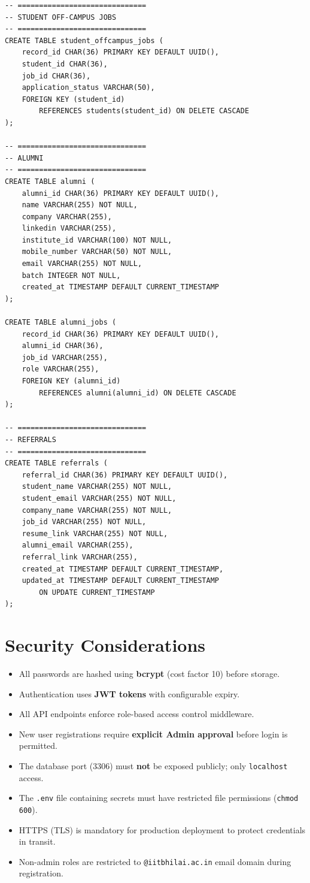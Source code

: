 \documentclass[12pt,a4paper]{article}
\begin{document}
\begin{lstlisting}[style=sqlstyle]
-- ==============================
-- STUDENT OFF-CAMPUS JOBS
-- ==============================
CREATE TABLE student_offcampus_jobs (
    record_id CHAR(36) PRIMARY KEY DEFAULT UUID(),
    student_id CHAR(36),
    job_id CHAR(36),
    application_status VARCHAR(50),
    FOREIGN KEY (student_id)
        REFERENCES students(student_id) ON DELETE CASCADE
);

-- ==============================
-- ALUMNI
-- ==============================
CREATE TABLE alumni (
    alumni_id CHAR(36) PRIMARY KEY DEFAULT UUID(),
    name VARCHAR(255) NOT NULL,
    company VARCHAR(255),
    linkedin VARCHAR(255),
    institute_id VARCHAR(100) NOT NULL,
    mobile_number VARCHAR(50) NOT NULL,
    email VARCHAR(255) NOT NULL,
    batch INTEGER NOT NULL,
    created_at TIMESTAMP DEFAULT CURRENT_TIMESTAMP
);

CREATE TABLE alumni_jobs (
    record_id CHAR(36) PRIMARY KEY DEFAULT UUID(),
    alumni_id CHAR(36),
    job_id VARCHAR(255),
    role VARCHAR(255),
    FOREIGN KEY (alumni_id)
        REFERENCES alumni(alumni_id) ON DELETE CASCADE
);

-- ==============================
-- REFERRALS
-- ==============================
CREATE TABLE referrals (
    referral_id CHAR(36) PRIMARY KEY DEFAULT UUID(),
    student_name VARCHAR(255) NOT NULL,
    student_email VARCHAR(255) NOT NULL,
    company_name VARCHAR(255) NOT NULL,
    job_id VARCHAR(255) NOT NULL,
    resume_link VARCHAR(255) NOT NULL,
    alumni_email VARCHAR(255),
    referral_link VARCHAR(255),
    created_at TIMESTAMP DEFAULT CURRENT_TIMESTAMP,
    updated_at TIMESTAMP DEFAULT CURRENT_TIMESTAMP
        ON UPDATE CURRENT_TIMESTAMP
);
\end{lstlisting}

\section{Security Considerations}

\begin{itemize}[nosep]
    \item All passwords are hashed using \textbf{bcrypt} (cost factor 10) before storage.
    \item Authentication uses \textbf{JWT tokens} with configurable expiry.
    \item All API endpoints enforce role-based access control middleware.
    \item New user registrations require \textbf{explicit Admin approval} before login is permitted.
    \item The database port (3306) must \textbf{not} be exposed publicly; only \texttt{localhost} access.
    \item The \texttt{.env} file containing secrets must have restricted file permissions (\texttt{chmod 600}).
    \item HTTPS (TLS) is mandatory for production deployment to protect credentials in transit.
    \item Non-admin roles are restricted to \texttt{@iitbhilai.ac.in} email domain during registration.
\end{itemize}
\end{document}
